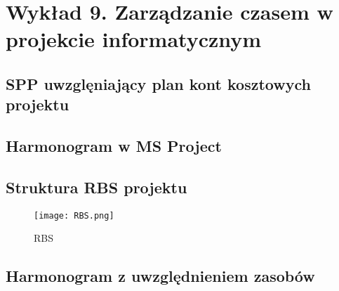 \chapter{Wykład 9. Zarządzanie czasem w projekcie informatycznym}

\section{SPP uwzglęniający plan kont kosztowych projektu}




\section{Harmonogram w MS Project}




\begin{landscape}

\section{Struktura RBS projektu}

\begin{figure}[!h]
\centering
\texttt{[image: RBS.png]}
\caption[RBS]{RBS}
\label{rysunekProces}
\end{figure}

\end{landscape}


\section{Harmonogram z uwzględnieniem zasobów}



